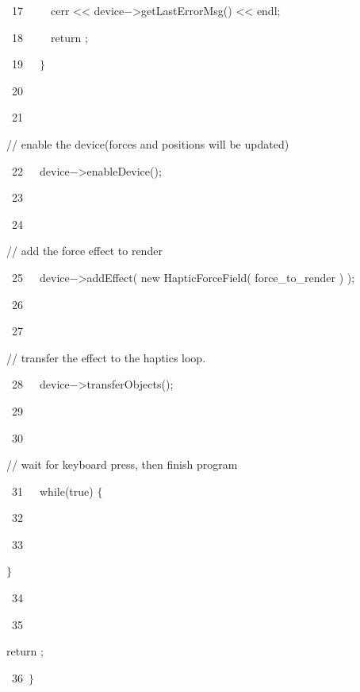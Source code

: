 {{\hlline \ \ \ 17\ }{\hlstd }{\hlstd\ \ \ \ }{\hlstd cerr }{\hlsym $\mathord{<}$$\mathord{<}$ }{\hlstd device}{\hlsym $\mathord{-}$$\mathord{>}$}{\hlstd }{\hlkwd getLastErrorMsg}{\hlstd }{\hlsym () $\mathord{<}$$\mathord{<}$ }{\hlstd endl}{\hlsym ;}\leavevmode\par
{\hlline \ \ \ 18\ }{\hlstd }{\hlstd\ \ \ \ }{\hlstd }{\hlkwa return }{\hlstd }{}{\hlstd }{\hlsym ;}\leavevmode\par
{\hlline \ \ \ 19\ }{\hlstd }{\hlstd\ \ }{\hlstd }{\hlsym $\}$}\leavevmode\par
{\hlline \ \ \ 20\ }{\hlstd \leavevmode\par
{\hlline \ \ \ 21\ }}{\hlstd\ \ }{\hlstd }{\hlslc // enable the device(forces and positions will be updated)}\leavevmode\par
{\hlline \ \ \ 22\ }{\hlstd }{\hlstd\ \ }{\hlstd device}{\hlsym $\mathord{-}$$\mathord{>}$}{\hlstd }{\hlkwd enableDevice}{\hlstd }{\hlsym ();}\leavevmode\par
{\hlline \ \ \ 23\ }{\hlstd \leavevmode\par
{\hlline \ \ \ 24\ }}{\hlstd\ \ }{\hlstd }{\hlslc // add the force effect to render}\leavevmode\par
{\hlline \ \ \ 25\ }{\hlstd }{\hlstd\ \ }{\hlstd device}{\hlsym $\mathord{-}$$\mathord{>}$}{\hlstd }{\hlkwd addEffect}{\hlstd }{\hlsym ( }{\hlstd }{\hlkwa new }{\hlstd }{\hlkwd HapticForceField}{\hlstd }{\hlsym ( }{\hlstd force\_{}to\_{}render }{\hlsym ) );}\leavevmode\par
{\hlline \ \ \ 26\ }{\hlstd \leavevmode\par
{\hlline \ \ \ 27\ }}{\hlstd\ \ }{\hlstd }{\hlslc // transfer the effect to the haptics loop.}\leavevmode\par
{\hlline \ \ \ 28\ }{\hlstd }{\hlstd\ \ }{\hlstd device}{\hlsym $\mathord{-}$$\mathord{>}$}{\hlstd }{\hlkwd transferObjects}{\hlstd }{\hlsym ();}\leavevmode\par
{\hlline \ \ \ 29\ }{\hlstd \leavevmode\par
{\hlline \ \ \ 30\ }}{\hlstd\ \ }{\hlstd }{\hlslc // wait for keyboard press, then finish program}\leavevmode\par
{\hlline \ \ \ 31\ }{\hlstd }{\hlstd\ \ }{\hlstd }{\hlkwa while}{\hlstd }{\hlsym (}{\hlstd }{\hlkwa true}{\hlstd }{\hlsym ) $\{$}\leavevmode\par
{\hlline \ \ \ 32\ }{\hlstd \leavevmode\par
{\hlline \ \ \ 33\ }}{\hlstd\ \ }{\hlstd }{\hlsym $\}$}\leavevmode\par
{\hlline \ \ \ 34\ }{\hlstd \leavevmode\par
{\hlline \ \ \ 35\ }}{\hlstd\ \ }{\hlstd }{\hlkwa return }{\hlstd }{}{\hlstd }{\hlsym ;}\leavevmode\par
{\hlline \ \ \ 36\ }{\hlstd }{\hlsym $\}$}{\hlstd }\leavevmode\par
}

